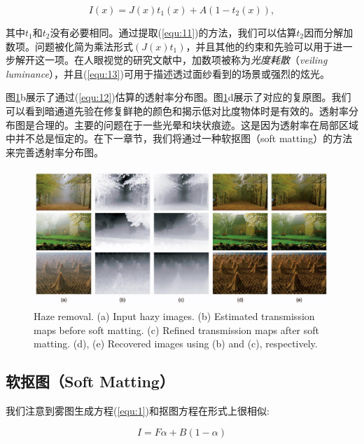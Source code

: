 \documentclass{ctexart}
\begin{document}
\begin{equation}\label{equ:13}
	I(x) = J(x)t_1(x) + A(1 - t_2(x)),
\end{equation}

其中$t_1$和$t_2$没有必要相同。通过提取(\ref{equ:11})的方法，我们可以估算$t_2$因而分解加数项。问题被化简为乘法形式$(J(x)t_1)$，并且其他的约束和先验可以用于进一步解开这一项。在人眼视觉的研究文献\cite{GilchristJacobsen1983}中，加数项被称为\emph{光度耗散}（\emph{veiling luminance}），并且(\ref{equ:13})可用于描述透过面纱看到的场景或强烈的炫光。\par

图\ref{fig:06}b展示了通过(\ref{equ:12})估算的透射率分布图。图\ref{fig:06}d展示了对应的复原图。我们可以看到暗通道先验在修复鲜艳的颜色和揭示低对比度物体时是有效的。透射率分布图是合理的。主要的问题在于一些光晕和块状痕迹。这是因为透射率在局部区域中并不总是恒定的。在下一章节，我们将通过一种软抠图（soft matting）的方法来完善透射率分布图。\par

\begin{figure}[tbp]
	\centering
	\includegraphics[width=\textwidth]{img/06.jpg}
	\caption{Haze removal. (a) Input hazy images. (b) Estimated transmission maps before soft matting. (c) Refined transmission maps after soft matting. (d), (e) Recovered images using (b) and (c), respectively.}\label{fig:06}
\end{figure}



\subsection{软抠图（Soft Matting）} %
我们注意到雾图生成方程(\ref{equ:1})和抠图方程在形式上很相似:

\begin{equation}\label{equ:14}
	I = F \alpha + B (1 - \alpha)
\end{equation}
\end{document}
